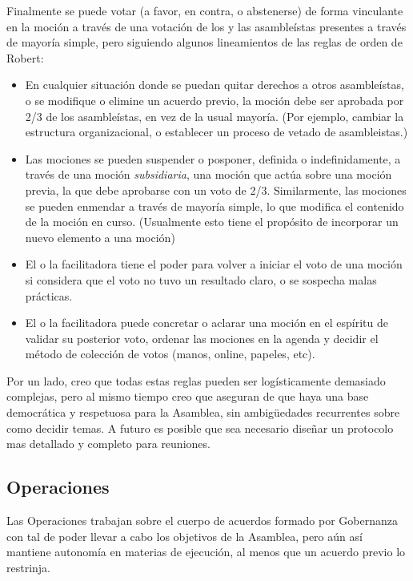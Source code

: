 \documentclass[justified]{tufte-handout} %
\begin{document}
Finalmente se puede votar (a favor, en contra, o abstenerse) de forma vinculante en la moción a través de una votación de los y las asambleístas presentes a través de mayoría simple, pero siguiendo algunos lineamientos de las reglas de orden de Robert\cite{robertrules}:
\begin{itemize}
	\item En cualquier situación donde se puedan quitar derechos a otros asambleístas, o se modifique o elimine un acuerdo previo, la moción debe ser aprobada por 2/3 de los asambleístas, en vez de la usual mayoría. (Por ejemplo, cambiar la estructura organizacional, o establecer un proceso de vetado de asambleistas.)
	\item Las mociones se pueden suspender o posponer, definida o indefinidamente, a través de una moción \textit{subsidiaria}, una moción que actúa sobre una moción previa, la que debe aprobarse con un voto de 2/3. Similarmente, las mociones se pueden enmendar a través de mayoría simple, lo que modifica el contenido de la moción en curso. (Usualmente esto tiene el propósito de incorporar un nuevo elemento a una moción)
	\item El o la facilitadora tiene el poder para volver a iniciar el voto de una moción si considera que el voto no tuvo un resultado claro, o se sospecha malas prácticas.
	\item El o la facilitadora puede concretar o aclarar una moción en el espíritu de validar su posterior voto, ordenar las mociones en la agenda y decidir el método de colección de votos (manos, online, papeles, etc).
\end{itemize}

Por un lado, creo que todas estas reglas pueden ser logísticamente demasiado complejas, pero al mismo tiempo creo que aseguran de que haya una base democrática y respetuosa para la Asamblea, sin ambigüedades recurrentes sobre como decidir temas. A futuro es posible que sea necesario diseñar un protocolo mas detallado y completo para reuniones.

\subsection{Operaciones}
Las Operaciones trabajan sobre el cuerpo de acuerdos formado por Gobernanza con tal de poder llevar a cabo los objetivos de la Asamblea, pero aún así mantiene autonomía en materias de ejecución, al menos que un acuerdo previo lo restrinja.
\pagebreak
\end{document}
